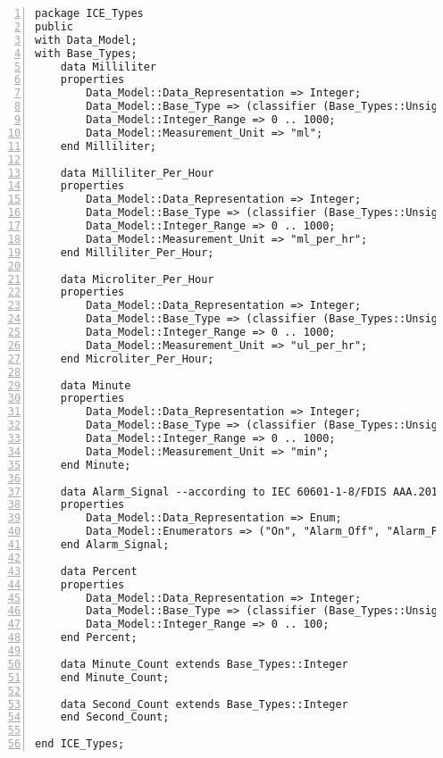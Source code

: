 \newpage

\singlespacing
\begin{lstlisting}[language=aadl, gobble=0, numbers=left, caption={\lstinline{ICE_Types} package}]
package ICE_Types
public
with Data_Model;
with Base_Types;
	data Milliliter
	properties
		Data_Model::Data_Representation => Integer;
		Data_Model::Base_Type => (classifier (Base_Types::Unsigned_16)); --two bytes for 0-1000 ml
		Data_Model::Integer_Range => 0 .. 1000;
		Data_Model::Measurement_Unit => "ml";
	end Milliliter;

	data Milliliter_Per_Hour
	properties
		Data_Model::Data_Representation => Integer;
		Data_Model::Base_Type => (classifier (Base_Types::Unsigned_16)); --two bytes for 0-1000 ml/hr
		Data_Model::Integer_Range => 0 .. 1000;
		Data_Model::Measurement_Unit => "ml_per_hr";
	end Milliliter_Per_Hour;

	data Microliter_Per_Hour
	properties
		Data_Model::Data_Representation => Integer;
		Data_Model::Base_Type => (classifier (Base_Types::Unsigned_16)); --two bytes for 0-1000 ul/hr
		Data_Model::Integer_Range => 0 .. 1000;
		Data_Model::Measurement_Unit => "ul_per_hr";
	end Microliter_Per_Hour;

	data Minute
	properties
		Data_Model::Data_Representation => Integer;
		Data_Model::Base_Type => (classifier (Base_Types::Unsigned_16)); --two bytes for 0-1000 minutes
		Data_Model::Integer_Range => 0 .. 1000;
		Data_Model::Measurement_Unit => "min";
	end Minute;

	data Alarm_Signal --according to IEC 60601-1-8/FDIS AAA.201.8 ALARM SIGNAL inactivation states
	properties
		Data_Model::Data_Representation => Enum;
		Data_Model::Enumerators => ("On", "Alarm_Off", "Alarm_Paused", "Audio_Off", "Audio_Paused");
	end Alarm_Signal;

	data Percent
	properties
		Data_Model::Data_Representation => Integer;
		Data_Model::Base_Type => (classifier (Base_Types::Unsigned_8)); --one byte for 0-100 percent
		Data_Model::Integer_Range => 0 .. 100;
	end Percent;

	data Minute_Count extends Base_Types::Integer
	end Minute_Count;

	data Second_Count extends Base_Types::Integer
	end Second_Count;

end ICE_Types;
\end{lstlisting} 
\label{listing:aadl:ice_types}
\doublespacing

\newpage

